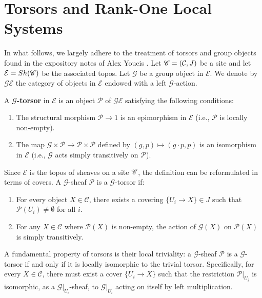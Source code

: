 \section{Torsors and Rank-One Local Systems}

In what follows, we largely adhere to the treatment of torsors and group objects found in the expository notes of Alex Youcis \cite{YoucisTorsors}.
Let $\mathscr{C}=(\mathcal{C}, J)$ be a site and let $\mathcal{E}=Sh(\mathscr{C})$ be the associated topos. 
Let $\mathcal{G}$ be a group object in $\mathcal{E}$. 
We denote by $\mathcal{G}\mathcal{E}$ the category of objects in $\mathcal{E}$ endowed with a left $\mathcal{G}$-action. 

\begin{definition}
    A \textbf{$\mathcal{G}$-torsor} in $\mathcal{E}$ is an object $\mathcal{P}$ of $\mathcal{G}\mathcal{E}$ satisfying the following conditions:
    \begin{enumerate}
        \item The structural morphism $\mathcal{P} \to 1$ is an epimorphism in $\mathcal{E}$ (i.e., $\mathcal{P}$ is locally non-empty).
        \item The map $\mathcal{G} \times \mathcal{P} \to \mathcal{P} \times \mathcal{P}$ defined by $(g, p) \mapsto (g \cdot p, p)$ is an isomorphism in $\mathcal{E}$ (i.e., $\mathcal{G}$ acts simply transitively on $\mathcal{P}$).
    \end{enumerate}
\end{definition}

Since $\mathcal{E}$ is the topos of sheaves on a site $\mathscr{C}$, the definition can be reformulated in terms of covers. A $\mathcal{G}$-sheaf $\mathcal{P}$ is a $\mathcal{G}$-torsor if:
\begin{enumerate}
    \item For every object $X \in \mathcal{C}$, there exists a covering $\{ U_i \to X \} \in J$ such that $\mathcal{P}(U_i) \neq \emptyset$ for all $i$.
    \item For any $X \in \mathcal{C}$ where $\mathcal{P}(X)$ is non-empty, the action of $\mathcal{G}(X)$ on $\mathcal{P}(X)$ is simply transitively.
\end{enumerate}

A fundamental property of torsors is their local triviality: 
a $\mathcal{G}$-sheaf $\mathcal{P}$ is a $\mathcal{G}$-torsor if and only if it is locally isomorphic to the trivial torsor. 
Specifically, for every $X \in \mathcal{C}$, there must exist a cover $\{ U_i \to X \}$ such that the restriction $\mathcal{P}|_{U_i}$ is 
isomorphic, as a $\mathcal{G}|_{U_i}$-sheaf, to $\mathcal{G}|_{U_i}$ acting on itself by left multiplication.

